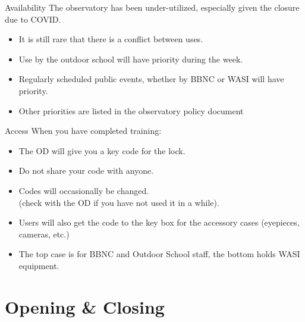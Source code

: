 
\begin{frame}{Availability}
  \Large
  The observatory has been under-utilized, especially given the closure due to COVID.
  \begin{itemize}
    \item It is still rare that there is a conflict between uses.
    \item Use by the outdoor school will have priority during the week.
    \item Regularly scheduled public events, whether by BBNC or WASI will have priority.
    \item Other priorities are listed in the observatory policy document
  \end{itemize}
\end{frame}


\begin{frame}{Access}
  \Large
  When you have completed training:
  \begin{itemize}
    \item The OD will give you a key code for the lock.
    \item Do not share your code with anyone.
    \item Codes will occasionally be changed.\\
      (check with the OD if you have not used it in a while).
    \item Users will also get the code to the key box for the accessory cases (eyepieces, cameras, etc.)
    \item The top case is for BBNC and Outdoor School staff, the bottom holds WASI equipment.
  \end{itemize}
\end{frame}


\section{Opening \& Closing}

